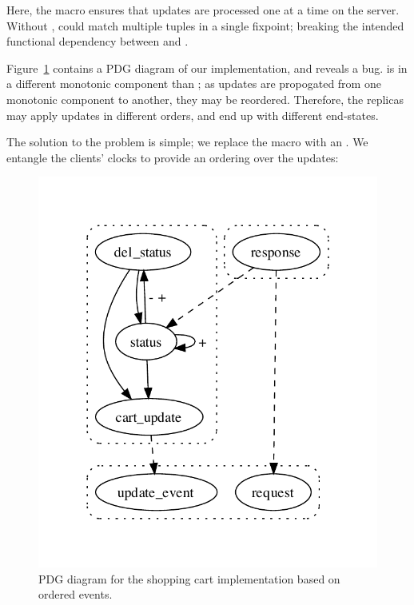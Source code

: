 Here, the  macro ensures that updates are
processed one at a time on the server.  Without ,
 could match multiple tuples in a single fixpoint;
breaking the intended functional dependency between 
and .


Figure~\ref{fig:cs-pdg-2} contains a PDG diagram of our
implementation, and reveals a bug.   is in a
different monotonic component than ; as updates
are propogated from one monotonic component to another, they may be
reordered.  Therefore, the replicas may apply updates in different
orders, and end up with different end-states.

The solution to the problem is simple; we replace the  macro with an .  We entangle the clients' clocks to provide an ordering over the updates:


\begin{figure}[t]
\centering
\includegraphics[width=0.65\linewidth]{vizza_straw.pdf}
\caption{PDG diagram for the shopping cart implementation based on ordered events.}
\label{fig:cs-pdg-2}
\end{figure}

